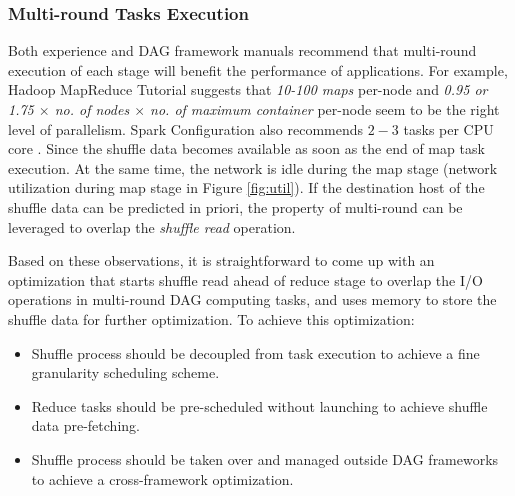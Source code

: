 \subsubsection{Multi-round Tasks Execution}\label{multi}
Both experience and DAG framework manuals recommend that multi-round execution of each stage will benefit the performance of applications.
For example, Hadoop MapReduce Tutorial \cite{hadooptutorial} suggests that \textit{10-100 maps} per-node and \textit{0.95 or 1.75 $\times$ no. of nodes $\times$ no. of maximum container} per-node seem to be the right level of parallelism. 
Spark Configuration also recommends $2-3$ tasks per CPU core \cite{sparkconf}.
Since the shuffle data becomes available as soon as the end of map task execution. 
At the same time, the network is idle during the map stage (network utilization during map stage in Figure \ref{fig:util}). 
If the destination host of the shuffle data can be predicted in priori, the property of multi-round can be leveraged to overlap the \textit{shuffle read} operation.

Based on these observations, it is straightforward to come up with an optimization that starts shuffle read ahead of reduce stage to overlap the I/O operations in multi-round DAG computing tasks, and uses memory to store the shuffle data for further optimization. 
To achieve this optimization:
\begin{itemize}
	\item Shuffle process should be decoupled from task execution to achieve a fine granularity scheduling scheme.
	\item Reduce tasks should be pre-scheduled without launching to achieve shuffle data pre-fetching.
	\item Shuffle process should be taken over and managed outside DAG frameworks to achieve a cross-framework optimization.
\end{itemize}
